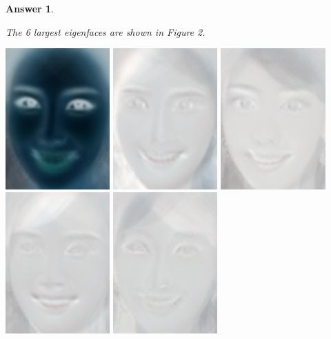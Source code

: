 \documentclass[12pt]{article}
\theoremstyle{colon}
\newtheorem*{answer}{Answer}
\begin{document}
\begin{answer}
\begin{enumerate}[label=\arabic*)]
      The 6 largest eigenfaces are shown in Figure 2.
      \begin{center}
        \includegraphics[width=0.3\textwidth]{eigenface1.png}
        \includegraphics[width=0.3\textwidth]{eigenface2.png}
        \includegraphics[width=0.3\textwidth]{eigenface3.png}
        \includegraphics[width=0.3\textwidth]{eigenface4.png}
        \includegraphics[width=0.3\textwidth]{eigenface5.png}

\end{center}
\end{enumerate}
\end{answer}
\end{document}
